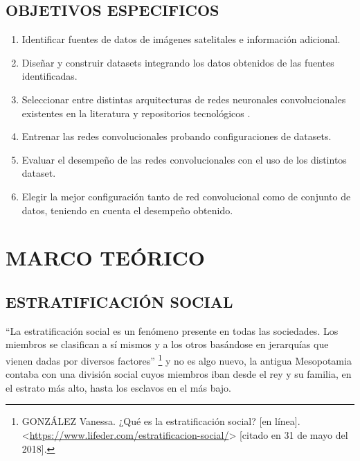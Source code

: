 	\section{OBJETIVOS ESPECIFICOS}
	    \begin{enumerate}
	      \item Identificar fuentes de datos de imágenes satelitales e información adicional.
	      \item Diseñar y construir datasets integrando los datos obtenidos de las fuentes identificadas.
	      \item Seleccionar entre distintas arquitecturas de redes neuronales convolucionales existentes en la literatura y repositorios tecnológicos    .
	      \item Entrenar las redes convolucionales probando configuraciones de datasets.
	      \item Evaluar el desempeño de las redes convolucionales con el uso de los distintos dataset. 
	      \item Elegir la mejor configuración tanto de red convolucional como de conjunto de datos, teniendo en cuenta el desempeño obtenido.   
	    \end{enumerate}


\newpage\chapter{MARCO TEÓRICO}    
     
    
	\section{ESTRATIFICACIÓN SOCIAL}
    
    “La estratificación social es un fenómeno presente en todas las sociedades. Los miembros se clasifican a sí mismos y a los otros basándose en jerarquías que vienen dadas por diversos factores”
    \footnote[8]{GONZÁLEZ Vanessa. ¿Qué es la estratificación social? [en línea]. <\url{https://www.lifeder.com/estratificacion-social/}> [citado en 31 de mayo del 2018].} y no es algo nuevo, la antigua Mesopotamia contaba con una división social cuyos miembros iban desde el rey y su familia, en el estrato más alto, hasta los esclavos en el más bajo.
    
